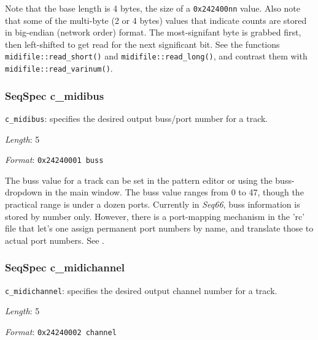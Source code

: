   Note that the base length is 4 bytes, the size of a \texttt{0x242400nn}
   value.  Also note that some of the multi-byte (2 or 4 bytes) values that
   indicate counts are stored in big-endian (network order) format.  The
   most-signifant byte is grabbed first, then
   left-shifted to get read for the next significant bit.
   See the functions
   \texttt{midifile::read\_short()} and
   \texttt{midifile::read\_long()}, and contrast them with
   \texttt{midifile::read\_varinum()}.

\subsubsection{SeqSpec c\_midibus}
\label{subsubsec:midi_format_track_seqspec_midibus}


   \begin{description}
      \item \texttt{c\_midibus}:
         specifies the desired output buss/port number for a track.
      \item \textsl{Length}: 5
      \item \textsl{Format}: \texttt{0x24240001 buss}
   \end{description}

   The buss value for a track can be set in the pattern editor or using the
   buss-dropdown in the main window.
   The buss value ranges from 0 to 47, though the practical range is under a
   dozen ports.  Currently in \textsl{Seq66}, buss information is stored by
   number only.  However, there is a port-mapping mechanism in the 'rc' file
   that let's one assign permanent port numbers by name, and translate those to
   actual port numbers.
   See .

\subsubsection{SeqSpec c\_midichannel}
\label{subsubsec:midi_format_track_seqspec_midichannel}


   \begin{description}
      \item \texttt{c\_midichannel}:
         specifies the desired output channel number for a track.
      \item \textsl{Length}: 5
      \item \textsl{Format}: \texttt{0x24240002 channel}
   \end{description}

